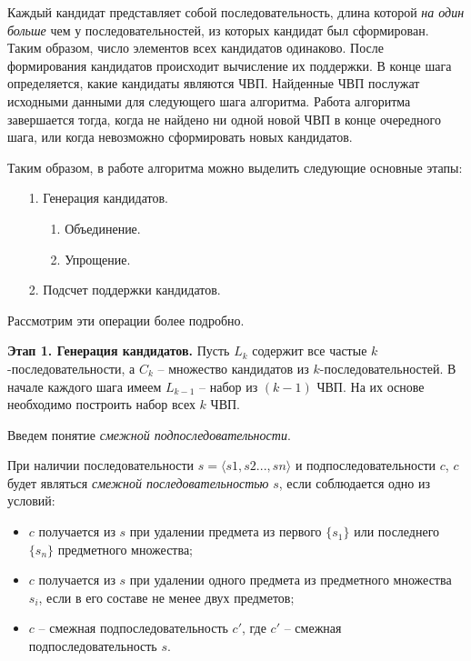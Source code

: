 Каждый кандидат представляет собой последовательность, длина которой \textit{на один больше} чем у последовательностей, из которых кандидат был сформирован. Таким образом, число элементов всех кандидатов одинаково. После формирования кандидатов происходит вычисление их поддержки. В конце шага определяется, какие кандидаты являются ЧВП. Найденные ЧВП послужат исходными данными для следующего шага алгоритма. Работа алгоритма завершается тогда, когда не найдено ни одной новой ЧВП в конце очередного шага, или когда невозможно сформировать новых кандидатов.

Таким образом, в работе алгоритма можно выделить следующие основные этапы:


\begin{enumerate}
	\item[1.] Генерация кандидатов.
	\begin{enumerate}
		\item[1.] Объединение.
		\item[2.] Упрощение.
	\end{enumerate}
	\item[2.] Подсчет поддержки кандидатов.
\end{enumerate}

Рассмотрим эти операции более подробно.

\textbf{Этап 1. Генерация кандидатов.} Пусть $L_k$ содержит все частые $k$-последовательности, а $C_k$ – множество кандидатов из $k$-последовательностей. В начале каждого шага имеем $L_{k-1}$ – набор из $(k-1)$ ЧВП. На их основе необходимо построить набор всех $k$ ЧВП.

Введем понятие \textit{смежной подпоследовательности}.

При наличии последовательности $s = \langle s1, s2..., sn \rangle$ и подпоследовательности $c$, $c$ будет являться \textit{смежной последовательностью} $s$, если соблюдается одно из условий:
\begin{itemize}
	\item $c$ получается из $s$ при удалении предмета из первого $\{s_1\}$ или последнего $\{s_n\}$ предметного множества;
	\item $c$ получается из $s$ при удалении одного предмета из предметного множества $s_i$, если в его составе не менее двух предметов;
	\item $c$ – смежная подпоследовательность $c'$, где $c'$ – смежная подпоследовательность $s$.
\end{itemize}


